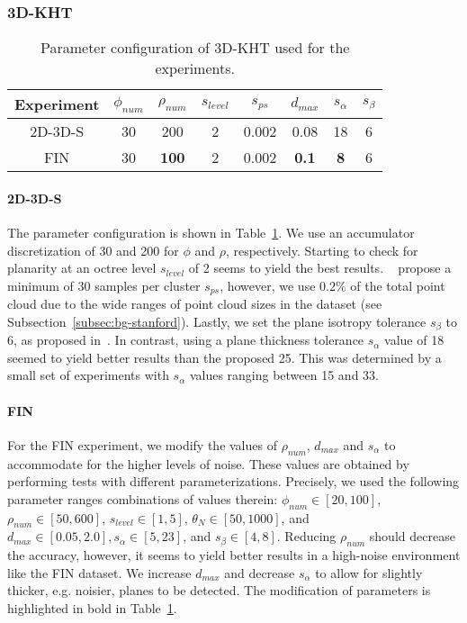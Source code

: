 \documentclass[main.tex]{subfiles}
\begin{document}
\subsubsection{3D-KHT}
\begin{table}[H]
    \centering
    \begin{tabular}{c|ccccccc}
        Experiment & $\phi_{num}$ & $\rho_{num}$ & $s_{level}$ & $s_{ps}$ & $d_{max}$    & $s_\alpha$ & $s_\beta$ \\ \hline
        2D-3D-S    & 30           & 200          & 2           & 0.002    & 0.08         & 18         & 6         \\
        FIN        & 30           & \textbf{100} & 2           & 0.002    & \textbf{0.1} & \textbf{8} & 6
    \end{tabular}%
    \caption{Parameter configuration of 3D-KHT used for the experiments.}
    \label{tab:3dkht-param}
\end{table}

\paragraph{2D-3D-S}
The parameter configuration is shown in Table~\ref{tab:3dkht-param}. We use an accumulator discretization of 30 and 200 for $\phi$ and $\rho$, respectively.
Starting to check for planarity at an octree level $s_{level}$ of 2 seems to yield the best results.
\citeauthor{Limberger_Oliveira_2015}~\cite{Limberger_Oliveira_2015} propose
a minimum of 30 samples per cluster $s_{ps}$, however, we use $0.2\%$ of the total point cloud due to the wide ranges of point cloud sizes in the dataset (see Subsection~\ref{subsec:bg-stanford}).
Lastly, we set the plane isotropy tolerance $s_\beta$ to 6, as proposed in~\cite[Section~3.1]{Limberger_Oliveira_2015}. 
In contrast, using a plane thickness tolerance $s_\alpha$ value of 18 seemed to yield better results than the proposed 25. 
This was determined by a small set of experiments with $s_\alpha$ values ranging between 15 and 33.

\paragraph{FIN}
For the FIN experiment, we modify the values of $\rho_{num}$, $d_{max}$ and $s_\alpha$ to accommodate for the higher levels of noise.
These values are obtained by performing tests with different parameterizations. Precisely, we used the following parameter ranges
combinations of values therein:
$\phi_{num} \in [20, 100]$, $\rho_{num} \in [50, 600]$, $s_{level}\in[1, 5]$, $\theta_N \in [50, 1000]$, and $d_{max} \in [0.05, 2.0], s_\alpha \in [5, 23]$, and $s_\beta \in [4, 8]$.
Reducing $\rho_{num}$ should decrease the accuracy, however, it seems to yield better results in a high-noise environment like the FIN dataset.
We increase $d_{max}$ and decrease $s_\alpha$ to allow for slightly thicker, e.g. noisier, planes to be detected.
The modification of parameters is highlighted in bold in Table~\ref{tab:3dkht-param}.
\end{document}
